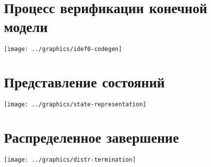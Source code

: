 \documentclass[12pt]{article}
\begin{document}





\section{Процесс верификации конечной модели}
\label{sec:idef0}

\begin{center}
  \texttt{[image: ../graphics/idef0-codegen]}
\end{center}

\section{Представление состояний}
\label{sec:state-represent}

\begin{center}
  \texttt{[image: ../graphics/state-representation]}
\end{center}

\section{Распределенное завершение}
\label{sec:distributed-termination}

\begin{center}
  \texttt{[image: ../graphics/distr-termination]}
\end{center}
\end{document}
